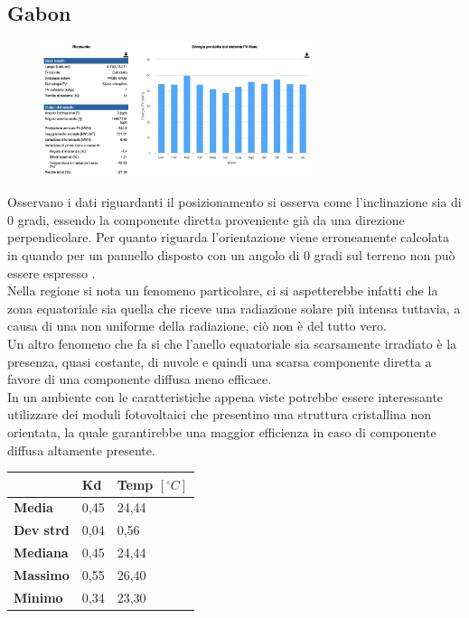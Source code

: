 \subsection{Gabon}
\begin{figure}[H]
    \centering
    \includegraphics[width=0.7\textwidth]{res/cap 5/impianto gabon}
\end{figure}\noindent
Osservano i dati riguardanti il posizionamento si osserva come l'inclinazione sia di 0 gradi, essendo la componente diretta proveniente già da una direzione perpendicolare. Per quanto riguarda l'orientazione viene erroneamente calcolata in quando per un pannello disposto con un angolo di 0 gradi sul terreno non può essere espresso .\\
Nella regione si nota un fenomeno particolare, ci si aspetterebbe infatti che la zona equatoriale sia quella che riceve una radiazione solare più intensa tuttavia, a causa di una non uniforme della radiazione, ciò non è del tutto vero.\\
Un altro fenomeno che fa si che l'anello equatoriale sia scarsamente irradiato è la presenza, quasi costante, di nuvole e quindi una scarsa componente diretta a favore di una componente diffusa meno efficace.\\
In un ambiente con le caratteristiche appena viste potrebbe essere interessante utilizzare dei moduli fotovoltaici che presentino una struttura cristallina non orientata, la quale garantirebbe una maggior efficienza in caso di componente diffusa altamente presente.
\begin{table}[H]
    \centering
    \begin{tabular}{|l|l|l|}
    \hline	
          & \textbf{Kd} & \textbf{Temp $[{}^\circ C]$} \\ \hline
        \textbf{Media} & 0,45 & 24,44 \\ \hline
        \textbf{Dev strd} & 0,04 & 0,56 \\ \hline
        \textbf{Mediana} & 0,45 & 24,44 \\ \hline
        \textbf{Massimo} & 0,55 & 26,40 \\ \hline
        \textbf{Minimo} & 0,34 & 23,30 \\ \hline
    \end{tabular}
\end{table}
